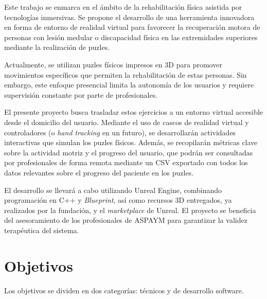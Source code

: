 
Este trabajo se enmarca en el ámbito de la rehabilitación física asistida por tecnologías inmersivas. Se propone el desarrollo de una herramienta innovadora en forma de entorno de realidad virtual para favorecer la recuperación motora de personas con lesión medular o discapacidad física en las extremidades superiores mediante la realización de puzles.

Actualmente, se utilizan puzles físicos impresos en 3D para promover movimientos específicos que permiten la rehabilitación de estas personas. Sin embargo, este enfoque presencial limita la autonomía de los usuarios y requiere supervisión constante por parte de profesionales.

El presente proyecto busca trasladar estos ejercicios a un entorno virtual accesible desde el domicilio del usuario. Mediante el uso de cascos de realidad virtual y controladores (o \textit{hand tracking} en un futuro), se desarrollarán actividades interactivas que simulan los puzles físicos. Además, se recopilarán métricas clave sobre la actividad motriz y el progreso del usuario, que podrán ser consultadas por profesionales de forma remota mediante un CSV exportado con todos los datos relevantes sobre el progreso del paciente en los puzles.

El desarrollo se llevará a cabo utilizando Unreal Engine, combinando programación en C++ y \textit{Blueprint}, así como recursos 3D entregados, ya realizados por la fundación, y el \textit{marketplace} de Unreal. El proyecto se beneficia del asesoramiento de los profesionales de ASPAYM para garantizar la validez terapéutica del sistema.

\section{Objetivos}
Los objetivos se dividen en dos categorías: técnicos y de desarrollo software.

